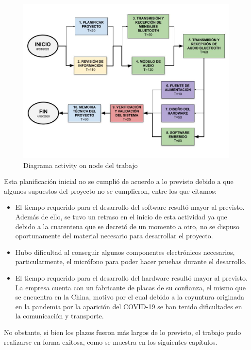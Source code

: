 \begin{figure}[htpb]
	\centering
	\includegraphics[scale=0.4]{./Figures/ActivityOnNode.jpg}
	\caption{Diagrama activity on node del trabajo}
	\label{fig:ActivityOnNode}
\end{figure}

Esta planificación inicial no se cumplió de acuerdo a lo previsto debido a que algunos supuestos del proyecto no se cumplieron, entre los que citamos:

\begin{itemize}

\item El tiempo requerido para el desarrollo del software resultó mayor al previsto. Además de ello, se tuvo un retraso en el inicio de esta actividad ya que debido a la cuarentena que se decretó de un momento a otro, no se dispuso oportunamente del material necesario para desarrollar el proyecto.

\item Hubo dificultad al conseguir algunos componentes electrónicos necesarios, particularmente, el micrófono para poder hacer pruebas durante el desarrollo.

\item El tiempo requerido para el desarrollo del hardware resultó mayor al previsto. La empresa cuenta con un fabricante de placas de su confianza, el mismo que se encuentra en la China, motivo por el cual debido a la coyuntura originada en la pandemia por la aparición del COVID-19 se han tenido dificultades en la comunicación y transporte.

\end{itemize}

No obstante, si bien los plazos fueron más largos de lo previsto, el trabajo pudo realizarse en forma exitosa, como se muestra en los siguientes capítulos.
